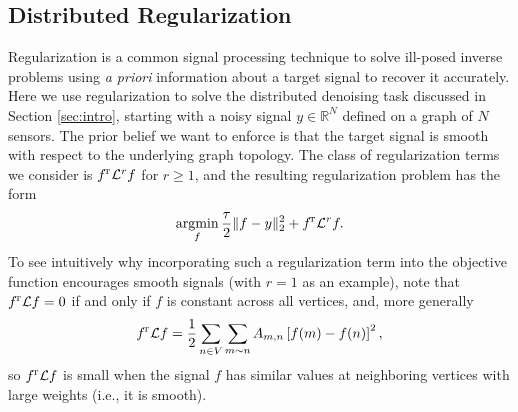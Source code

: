 \documentclass[conference]{IEEEtran}
\DeclareMathOperator*{\argmin}{argmin}
\newcommand{\norm}[1]{\lVert#1\rVert}
\newcommand{\R}{{\mathbb{R}}}
\renewcommand{\L}{{\mathcal{L}}}
\newcommand{\transpose}{{\!\scriptscriptstyle\mathrm T}}
\def\L{{\cal L}}
\begin{document}
\subsection{Distributed Regularization} \label{Se:reg}
Regularization is a common signal processing technique to solve ill-posed inverse problems using \emph{a priori} information about a target signal to recover it accurately. Here we use regularization to solve the distributed denoising task discussed in Section \ref{sec:intro}, starting with a noisy signal $y\in\R^N$ defined on a graph of $N$ sensors. The prior belief we want to
enforce is that the target signal is smooth with respect to the underlying graph topology. The class of regularization terms we consider is $f^{\transpose}\L^r f$ for $r \geq 1$, and the resulting regularization problem has the form
\begin{eqnarray}\label{Eq:reg_prob}
\argmin_f \frac{\tau}{2}\norm{f-y}_2^2+f^{\transpose}\L^r f.
\end{eqnarray}
To see intuitively why incorporating such a regularization term into the objective function encourages smooth signals (with $r=1$ as an example), note that $f^{\transpose}\L f=0$ if and only if $f$ is constant across all vertices, and, more generally
\begin{eqnarray*}
f^{\transpose}\L f=\frac{1}{2}\sum_{n \in V}\sum_{m \sim n}A_{m,n}\left[f(m)-f(n)\right]^2, \end{eqnarray*}
so $f^{\transpose}\L f$ is small when the signal $f$ has similar values at neighboring vertices with large weights (i.e., it is smooth).
\end{document}
